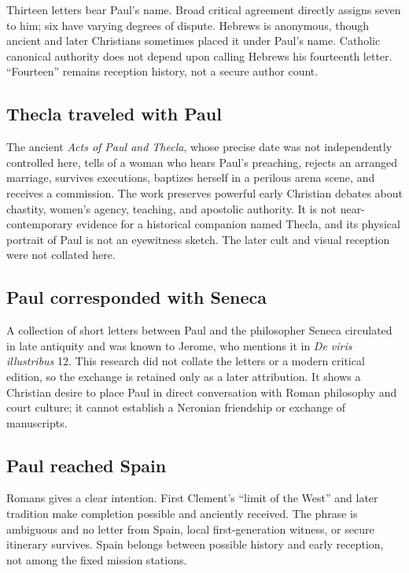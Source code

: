 Thirteen letters bear Paul's name. Broad critical agreement directly assigns
seven to him; six have varying degrees of dispute. Hebrews is anonymous,
though ancient and later Christians sometimes placed it under Paul's name.
Catholic canonical authority does not depend upon calling Hebrews his
fourteenth letter. ``Fourteen'' remains reception history, not a secure author
count.

\subsection{Thecla traveled with Paul}

The ancient \emph{Acts of Paul and Thecla}, whose precise date was not
independently controlled here, tells of a woman who
hears Paul's preaching, rejects an arranged marriage, survives executions,
baptizes herself in a perilous arena scene, and receives a commission. The
work preserves powerful early Christian debates about chastity, women's
agency, teaching, and apostolic authority. It is not near-contemporary evidence
for a historical companion named Thecla, and its physical portrait of Paul is
not an eyewitness sketch. The later cult and visual reception were not
collated here.

\subsection{Paul corresponded with Seneca}

A collection of short letters between Paul and the philosopher Seneca
circulated in late antiquity and was known to Jerome, who mentions it in
\emph{De viris illustribus} 12. This research did not collate the letters or a
modern critical edition, so the exchange is retained only as a later
attribution. It shows a Christian desire to place Paul in direct conversation
with Roman philosophy and court culture; it cannot establish a Neronian
friendship or exchange of manuscripts.

\subsection{Paul reached Spain}

Romans gives a clear intention. First Clement's ``limit of the West'' and
later tradition make completion possible and anciently received. The phrase
is ambiguous and no letter from Spain, local
first-generation witness, or secure itinerary survives. Spain belongs between
possible history and early reception, not among the fixed mission stations.

